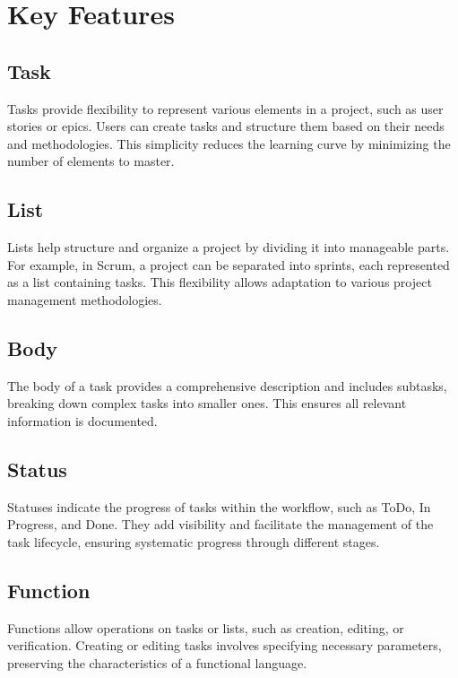 \documentclass{article}
\begin{document}
\section{Key Features}
\label{sec:key-features}

\subsection{Task}
\label{sec:task}
Tasks provide flexibility to represent various elements in a project, such as user stories or epics. Users can create tasks and structure them based on their needs and methodologies. This simplicity reduces the learning curve by minimizing the number of elements to master.

\subsection{List}
\label{sec:list}
Lists help structure and organize a project by dividing it into manageable parts. For example, in Scrum, a project can be separated into sprints, each represented as a list containing tasks. This flexibility allows adaptation to various project management methodologies.

\subsection{Body}
\label{sec:body}
The body of a task provides a comprehensive description and includes subtasks, breaking down complex tasks into smaller ones. This ensures all relevant information is documented.

\subsection{Status}
\label{sec:status}
Statuses indicate the progress of tasks within the workflow, such as ToDo, In Progress, and Done. They add visibility and facilitate the management of the task lifecycle, ensuring systematic progress through different stages.

\subsection{Function}
\label{sec:function}
Functions allow operations on tasks or lists, such as creation, editing, or verification. Creating or editing tasks involves specifying necessary parameters, preserving the characteristics of a functional language.
\end{document}
